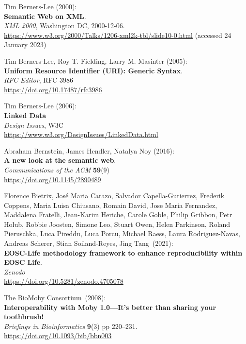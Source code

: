 \begin{thebibliography}{9}
Tim Berners-Lee (2000): \\
\textbf{Semantic Web on XML}. \\
\emph{XML 2000}, Washington DC, 2000-12-06. \\
\url{https://www.w3.org/2000/Talks/1206-xml2k-tbl/slide10-0.html}
(accessed 24 January 2023)

Tim Berners-Lee, Roy T. Fielding, Larry M. Masinter (2005): \\
\textbf{Uniform {Resource Identifier} ({URI}): {Generic Syntax}}.\\
\emph{RFC Editor}, RFC 3986 \\
\url{https://doi.org/10.17487/rfc3986}

Tim Berners-Lee (2006): \\
\textbf{Linked {Data}}\\
\emph{Design Issues}, W3C \\
\url{https://www.w3.org/DesignIssues/LinkedData.html}

Abraham Bernstein, James Hendler, Natalya Noy (2016): \\
\textbf{A new look at the semantic web}. \\
\emph{Communications of the ACM} \textbf{59}(9) \\
\url{https://doi.org/10.1145/2890489}

Florence Bietrix, José Maria Carazo, Salvador
Capella-Gutierrez, Frederik Coppens, Maria Luisa Chiusano, Romain David,
Jose Maria Fernandez, Maddalena Fratelli, Jean-Karim Heriche, Carole
Goble, Philip Gribbon, Petr Holub, Robbie Joosten, Simone Leo, Stuart
Owen, Helen Parkinson, Roland Pieruschka, Luca Pireddu, Luca Porcu,
Michael Raess, Laura Rodriguez-Navas, Andreas Scherer, Stian
Soiland-Reyes, Jing Tang~(2021):\\
\textbf{EOSC-Life methodology framework to enhance reproducibility
within EOSC Life}.\\
\emph{Zenodo}\\
\url{https://doi.org/10.5281/zenodo.4705078}

The BioMoby Consortium~(2008):\\
\textbf{Interoperability with Moby 1.0---It's better than sharing your
toothbrush!}\\
\emph{Briefings in Bioinformatics} \textbf{9}(3) pp
220--231.\\
\url{https://doi.org/10.1093/bib/bbn003}


\end{thebibliography}
